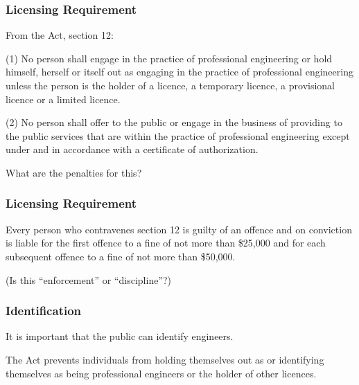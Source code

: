 \begin{frame}
\frametitle{Licensing Requirement}

From the Act, section 12:


(1) No person shall engage in the practice of professional engineering or hold himself, herself or itself out as engaging in the practice of professional engineering unless the person is the holder of a licence, a temporary licence, a provisional licence or a limited licence.

(2) No person shall offer to the public or engage in the business of providing to the public services that are within the practice of professional engineering except under and in accordance with a certificate of authorization.

What are the penalties for this?

\end{frame}




\begin{frame}
\frametitle{Licensing Requirement}

Every person who contravenes section 12 is guilty of an offence and on conviction is liable for the first offence to a fine of not more than \$25,000 and for each subsequent offence to a fine of not more than \$50,000. 

(Is this ``enforcement'' or ``discipline''?)

\end{frame}



\begin{frame}
\frametitle{Identification}

It is important that the public can identify engineers.

The Act prevents individuals from holding themselves out as or identifying themselves as being professional engineers or the holder of other licences.

\end{frame}




